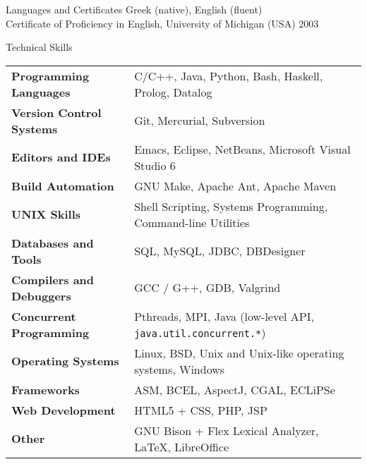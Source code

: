 \documentclass{resume}
\begin{document}
\begin{rSection}{Languages and Certificates}
  Greek (native), English (fluent) \\
  Certificate of Proficiency in English, University of Michigan (USA)
  \hfill 2003
\end{rSection}



\begin{rSection}{Technical Skills}

{\renewcommand{\arraystretch}{1.3}
\begin{tabular}{ @{} >{\bfseries}l @{\hspace{6ex}} l }

Programming Languages
   & C/C++, Java, Python, Bash, Haskell, Prolog, Datalog \\

Version Control Systems
   & Git, Mercurial, Subversion \\

Editors and IDEs
   & Emacs, Eclipse, NetBeans, Microsoft Visual Studio 6 \\

Build Automation
   & GNU Make, Apache Ant, Apache Maven \\

UNIX Skills
   & Shell Scripting, Systems Programming, Command-line Utilities \\

Databases and Tools
   & SQL, MySQL, JDBC, DBDesigner \\

Compilers and Debuggers
   & GCC / G++, GDB, Valgrind \\

Concurrent Programming
   & Pthreads, MPI, Java (low-level API, \texttt{java.util.concurrent.*}) \\

Operating Systems
   & Linux, BSD, Unix and Unix-like operating systems, Windows \\

Frameworks
   & ASM, BCEL, AspectJ, CGAL, ECLiPSe \\

Web Development
   & HTML5 + CSS, PHP, JSP \\

Other
   & GNU Bison + Flex Lexical Analyzer, \LaTeX{}, LibreOffice \\
\end{tabular}}
\end{rSection}
\end{document}
